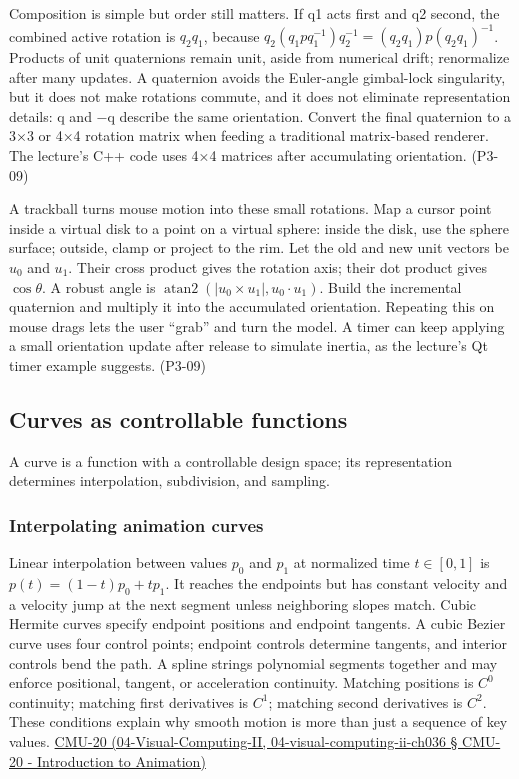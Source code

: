 Composition is simple but order still matters. If q1 acts first and q2 second, the combined active rotation is \(q_2q_1\), because \(q_2(q_1pq_1^{-1})q_2^{-1}=(q_2q_1)p(q_2q_1)^{-1}\). Products of unit quaternions remain unit, aside from numerical drift; renormalize after many updates. A quaternion avoids the Euler-angle gimbal-lock singularity, but it does not make rotations commute, and it does not eliminate representation details: q and −q describe the same orientation. Convert the final quaternion to a 3×3 or 4×4 rotation matrix when feeding a traditional matrix-based renderer. The lecture's C++ code uses 4×4 matrices after accumulating orientation. (P3-09)

A trackball turns mouse motion into these small rotations. Map a cursor point inside a virtual disk to a point on a virtual sphere: inside the disk, use the sphere surface; outside, clamp or project to the rim. Let the old and new unit vectors be \(u_0\) and \(u_1\). Their cross product gives the rotation axis; their dot product gives \(\cos\theta\). A robust angle is \(\operatorname{atan2}(|u_0\times u_1|,u_0\cdot u_1)\). Build the incremental quaternion and multiply it into the accumulated orientation. Repeating this on mouse drags lets the user ``grab'' and turn the model. A timer can keep applying a small orientation update after release to simulate inertia, as the lecture's Qt timer example suggests. (P3-09)

\subsection{Curves as controllable functions}\label{curves-as-controllable-functions}

A curve is a function with a controllable design space; its representation determines interpolation, subdivision, and sampling.

\subsubsection{Interpolating animation curves}\label{interpolating-animation-curves}

Linear interpolation between values \(p_0\) and \(p_1\) at normalized time \(t\in[0,1]\) is \(p(t)=(1-t)p_0+tp_1\). It reaches the endpoints but has constant velocity and a velocity jump at the next segment unless neighboring slopes match. Cubic Hermite curves specify endpoint positions and endpoint tangents. A cubic Bezier curve uses four control points; endpoint controls determine tangents, and interior controls bend the path. A spline strings polynomial segments together and may enforce positional, tangent, or acceleration continuity. Matching positions is \(C^0\) continuity; matching first derivatives is \(C^1\); matching second derivatives is \(C^2\). These conditions explain why smooth motion is more than just a sequence of key values. \href{}{CMU-20 (04-Visual-Computing-II, 04-visual-computing-ii-ch036 § CMU-20 - Introduction to Animation)}


